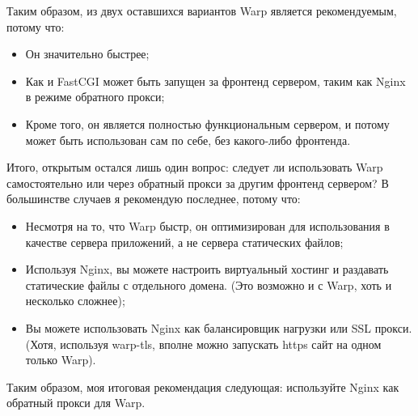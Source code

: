 %
Таким образом, из двух оставшихся вариантов Warp является рекомендуемым, потому что:
\begin{itemize}
  \item Он значительно быстрее;
  \item Как и FastCGI может быть запущен за фронтенд сервером, таким как Nginx в режиме обратного прокси;
  \item Кроме того, он является полностью функциональным сервером, и потому может быть использован сам по себе, без какого-либо фронтенда.
\end{itemize}
%
%
%

Итого, открытым остался лишь один вопрос: следует ли использовать Warp самостоятельно или через обратный прокси за другим фронтенд сервером? В большинстве случаев я рекомендую последнее, потому что:
\begin{itemize}
  \item Несмотря на то, что Warp быстр, он оптимизирован для использования в качестве сервера приложений, а не сервера статических файлов;
  \item Используя Nginx, вы можете настроить виртуальный хостинг и раздавать статические файлы с отдельного домена. (Это возможно и с Warp, хоть и несколько сложнее);
  \item Вы можете использовать Nginx как балансировщик нагрузки или SSL прокси. (Хотя, используя warp-tls, вполне можно запускать https сайт на одном только Warp).
\end{itemize}

Таким образом, моя итоговая рекомендация следующая: используйте Nginx как обратный прокси для Warp.

